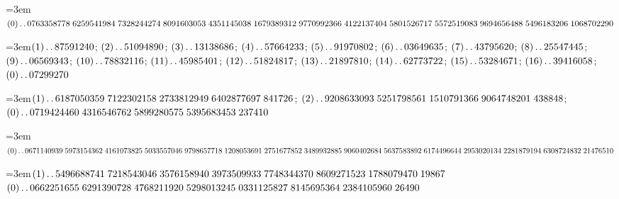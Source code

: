 \par\noindent\hangindent=3em\enspace $(0)\mathinner{.\,.}0763358778\;\allowbreak 6259541984\;\allowbreak 7328244274\;\allowbreak 8091603053\;\allowbreak 4351145038\;\allowbreak 1679389312\;\allowbreak 9770992366\;\allowbreak 4122137404\;\allowbreak 5801526717\;\allowbreak 5572519083\;\allowbreak 9694656488\;\allowbreak 5496183206\;\allowbreak 1068702290$\par\smallskip

\par\noindent\hangindent=3em\enspace $(1)\mathinner{.\,.}87591240$; $(2)\mathinner{.\,.}51094890$; $(3)\mathinner{.\,.}13138686$; $(4)\mathinner{.\,.}57664233$; $(5)\mathinner{.\,.}91970802$; $(6)\mathinner{.\,.}03649635$; $(7)\mathinner{.\,.}43795620$; $(8)\mathinner{.\,.}25547445$; $(9)\mathinner{.\,.}06569343$; $(10)\mathinner{.\,.}78832116$; $(11)\mathinner{.\,.}45985401$; $(12)\mathinner{.\,.}51824817$; $(13)\mathinner{.\,.}21897810$; $(14)\mathinner{.\,.}62773722$; $(15)\mathinner{.\,.}53284671$; $(16)\mathinner{.\,.}39416058$; $(0)\mathinner{.\,.}07299270$\par\smallskip

\par\noindent\hangindent=3em\enspace $(1)\mathinner{.\,.}6187050359\;\allowbreak 7122302158\;\allowbreak 2733812949\;\allowbreak 6402877697\;\allowbreak 841726$; $(2)\mathinner{.\,.}9208633093\;\allowbreak 5251798561\;\allowbreak 1510791366\;\allowbreak 9064748201\;\allowbreak 438848$; $(0)\mathinner{.\,.}0719424460\;\allowbreak 4316546762\;\allowbreak 5899280575\;\allowbreak 5395683453\;\allowbreak 237410$\par\smallskip

\par\noindent\hangindent=3em\enspace $(0)\mathinner{.\,.}0671140939\;\allowbreak 5973154362\;\allowbreak 4161073825\;\allowbreak 5033557046\;\allowbreak 9798657718\;\allowbreak 1208053691\;\allowbreak 2751677852\;\allowbreak 3489932885\;\allowbreak 9060402684\;\allowbreak 5637583892\;\allowbreak 6174496644\;\allowbreak 2953020134\;\allowbreak 2281879194\;\allowbreak 6308724832\;\allowbreak 21476510$\par\smallskip

\par\noindent\hangindent=3em\enspace $(1)\mathinner{.\,.}5496688741\;\allowbreak 7218543046\;\allowbreak 3576158940\;\allowbreak 3973509933\;\allowbreak 7748344370\;\allowbreak 8609271523\;\allowbreak 1788079470\;\allowbreak 19867$ $(0)\mathinner{.\,.}0662251655\;\allowbreak 6291390728\;\allowbreak 4768211920\;\allowbreak 5298013245\;\allowbreak 0331125827\;\allowbreak 8145695364\;\allowbreak 2384105960\;\allowbreak 26490$\par\smallskip

